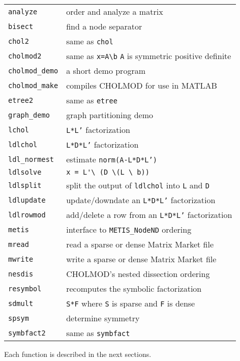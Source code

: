 \documentclass[11pt]{article}
\begin{document}
\vspace{0.1in}
\begin{tabular}{ll}
\hline
{\tt analyze}       & order and analyze a matrix \\
{\tt bisect}        & find a node separator \\
{\tt chol2}         & same as {\tt chol} \\
{\tt cholmod2}      & same as \verb'x=A\b' \verb'A' is symmetric positive
                      definite \\
{\tt cholmod\_demo} & a short demo program \\
{\tt cholmod\_make} & compiles CHOLMOD for use in MATLAB \\
{\tt etree2}        & same as {\tt etree} \\
{\tt graph\_demo}   & graph partitioning demo \\
{\tt lchol}         & {\tt L*L'} factorization \\
{\tt ldlchol}       & {\tt L*D*L'} factorization \\
{\tt ldl\_normest}  & estimate {\tt norm(A-L*D*L')} \\
{\tt ldlsolve}      & \verb"x = L'\ (D \(L \ b))" \\
{\tt ldlsplit}      & split the output of {\tt ldlchol} into {\tt L} and
                        {\tt D} \\
{\tt ldlupdate}     & update/downdate an {\tt L*D*L'} factorization \\
{\tt ldlrowmod}     & add/delete a row from an {\tt L*D*L'} factorization \\
{\tt metis}         & interface to {\tt METIS\_NodeND} ordering \\
{\tt mread}         & read a sparse or dense Matrix Market file \\
{\tt mwrite}        & write a sparse or dense Matrix Market file \\
{\tt nesdis}        & CHOLMOD's nested dissection ordering \\
{\tt resymbol}      & recomputes the symbolic factorization \\
{\tt sdmult}        & {\tt S*F} where {\tt S} is sparse and {\tt F} is dense \\
{\tt spsym}         & determine symmetry \\
{\tt symbfact2}     & same as {\tt symbfact} \\
\hline
\end{tabular}

\vspace{0.1in}\noindent
Each function is described in the next sections.
\end{document}
